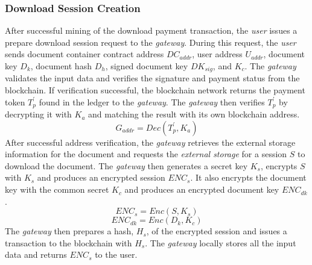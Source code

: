 \subsubsection{Download Session Creation}
After successful mining of the download payment transaction, the {\it user} issues a prepare download session request to the {\it gateway}. During this request, the {\it user} sends document container contract address $DC_{addr}$, user address $U_{addr}$, document key $D_k$, document hash $D_h$, signed document key $DK_{sig}$, and $K_c$. The {\it gateway} validates the input data and verifies the signature and payment status from the blockchain. If verification successful, the blockchain network returns the payment token $T_p^\prime$ found in the ledger to the {\it gateway}. The {\it gateway} then verifies $T_p^\prime$ by decrypting it with $K_a$ and matching the result with its own blockchain address. 
\begin{equation}
\label{eq-d-3}
G_{addr} = Dec (T_p^\prime, K_a)
\end{equation}
After successful address verification, the {\it gateway} retrieves the external storage information for the document and requests the {\it external storage} for a session $S$ to download the document. The {\it gateway} then generates a secret key $K_s$,  encrypts $S$ with $K_s$ and produces an encrypted session $ENC_s$. It also encrypts the document key with the common secret $K_c$ and produces an encrypted document key $ENC_{dk}$. 
\begin{equation}
\label{eq-d-4} 
ENC_s = Enc (S, K_s)
\end{equation}
\begin{equation}
\label{eq-d-5} 
ENC_{dk} = Enc (D_k, K_c)
\end{equation}
The {\it gateway} then prepares a hash, $H_s$, of the encrypted session and issues a transaction to the blockchain with $H_s$. The {\it gateway} locally stores all the input data and returns $ENC_s$ to the user.

